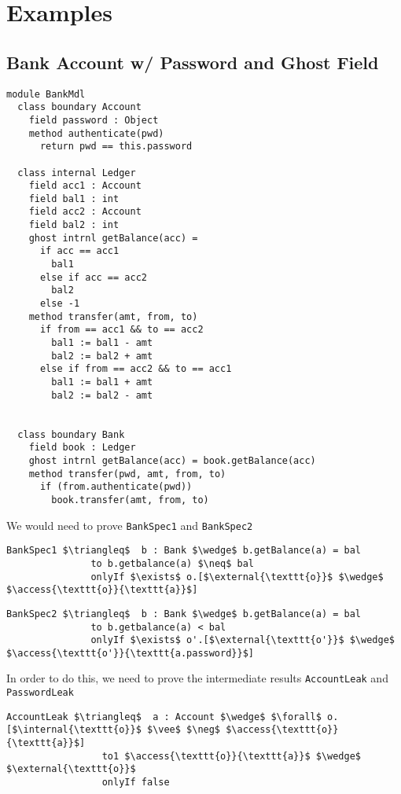 

\section{Examples}

\subsection{Bank Account w/ Password and Ghost Field}


\begin{lstlisting}[mathescape=true, frame=lines]
module BankMdl
  class boundary Account
    field password : Object
    method authenticate(pwd)
      return pwd == this.password

  class internal Ledger
    field acc1 : Account
    field bal1 : int
    field acc2 : Account
    field bal2 : int
    ghost intrnl getBalance(acc) = 
      if acc == acc1
        bal1
      else if acc == acc2
        bal2
      else -1
    method transfer(amt, from, to)
      if from == acc1 && to == acc2
        bal1 := bal1 - amt
        bal2 := bal2 + amt
      else if from == acc2 && to == acc1
        bal1 := bal1 + amt
        bal2 := bal2 - amt
      

  class boundary Bank
    field book : Ledger
    ghost intrnl getBalance(acc) = book.getBalance(acc)
    method transfer(pwd, amt, from, to)
      if (from.authenticate(pwd))
        book.transfer(amt, from, to)
\end{lstlisting}
We would need to prove \texttt{BankSpec1} and \texttt{BankSpec2}
\begin{lstlisting}[language = Chainmail, mathescape=true, frame=lines]
BankSpec1 $\triangleq$  b : Bank $\wedge$ b.getBalance(a) = bal 
               to b.getbalance(a) $\neq$ bal
               onlyIf $\exists$ o.[$\external{\texttt{o}}$ $\wedge$ $\access{\texttt{o}}{\texttt{a}}$]
\end{lstlisting}
\begin{lstlisting}[language = Chainmail, mathescape=true, frame=lines]
BankSpec2 $\triangleq$  b : Bank $\wedge$ b.getBalance(a) = bal 
               to b.getbalance(a) < bal
               onlyIf $\exists$ o'.[$\external{\texttt{o'}}$ $\wedge$ $\access{\texttt{o'}}{\texttt{a.password}}$]
\end{lstlisting}
In order to do this, we need to prove the intermediate results \texttt{AccountLeak} and \texttt{PasswordLeak}
\begin{lstlisting}[language = Chainmail, mathescape=true, frame=lines]
AccountLeak $\triangleq$  a : Account $\wedge$ $\forall$ o.[$\internal{\texttt{o}}$ $\vee$ $\neg$ $\access{\texttt{o}}{\texttt{a}}$]
                 to1 $\access{\texttt{o}}{\texttt{a}}$ $\wedge$ $\external{\texttt{o}}$
                 onlyIf false
\end{lstlisting}
